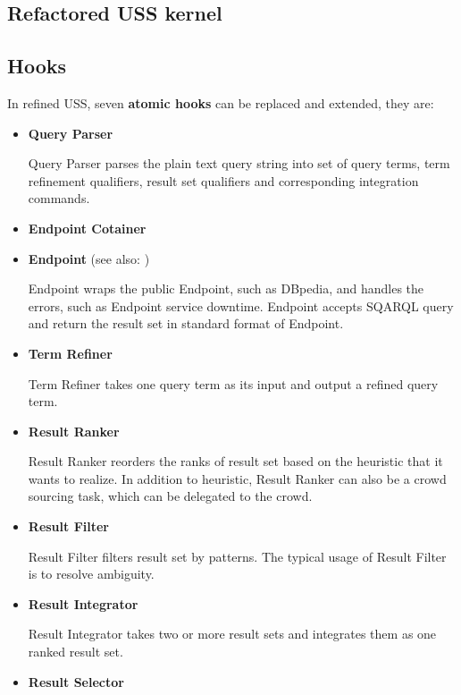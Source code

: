 \documentclass[letterpaper,10pt,english]{sphinxmanual}
\begin{document}
\subsection{Refactored USS kernel}
\label{docs/uss:refactored-uss-kernel}

\subsection{Hooks}
\label{docs/uss:hooks}
In refined USS, seven \textbf{atomic hooks} can be replaced and extended, they are:
\begin{itemize}
\item {} 
\textbf{Query Parser}

Query Parser parses the plain text query string into set of query terms, term refinement qualifiers, result set qualifiers and corresponding integration commands.

\item {} 
\textbf{Endpoint Cotainer}

\end{itemize}
\label{docs/uss:endpoint}\begin{itemize}
\item {} 
\textbf{Endpoint} (see also: {\hyperref[docs/api:Endpoint]{}})

Endpoint wraps the public Endpoint, such as DBpedia, and handles the errors, such as Endpoint service downtime. Endpoint accepts SQARQL query and return the result set in standard format of Endpoint.

\item {} 
\textbf{Term Refiner}

Term Refiner takes one query term as its input and output a refined query term.

\item {} 
\textbf{Result Ranker}

Result Ranker reorders the ranks of result set based on the heuristic that it wants to realize. In addition to heuristic, Result Ranker can also be a crowd sourcing task, which can be delegated to the crowd.

\item {} 
\textbf{Result Filter}

Result Filter filters result set by patterns. The typical usage of Result Filter is to resolve ambiguity.

\end{itemize}
\begin{itemize}
\item {} 
\textbf{Result Integrator}

Result Integrator takes two or more result sets and integrates them as one ranked result set.

\item {} 
\textbf{Result Selector}

\end{itemize}
\end{document}
